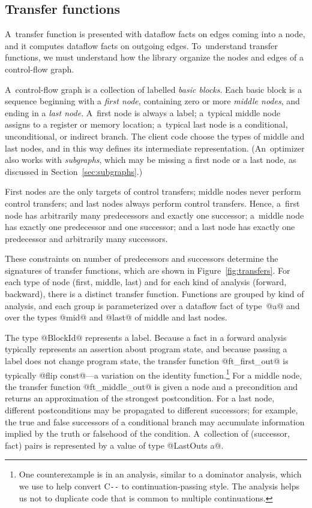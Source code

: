 \documentclass[blockstyle,preprint,natbib,nocopyrightspace]{sigplanconf}
\newcommand\PAL{\mbox{C{\texttt{-{}-}}}}
\newcommand\secref[1]{Section~\ref{sec:#1}}
\newcommand\seclabel[1]{\label{sec:#1}}
\newcommand\figref[1]{Figure~\ref{fig:#1}}
\begin{document}
\subsection{Transfer functions} \seclabel{tffuns}

A~transfer function is presented with dataflow facts on edges coming
into a node, and it computes dataflow facts on outgoing edges.
To~understand transfer functions, we must 
understand how the library organize the nodes and edges of a control-flow graph.

\seclabel{graph.intro}

A~control-flow graph is a collection of labelled \emph{basic blocks}.
Each basic block is a sequence beginning with a \emph{first node},
containing zero or more \emph{middle nodes},
and ending in a \emph{last node}.
A~first node is always a label;
a~typical middle node assigns to a register or memory
location;
a~typical last node is a conditional, unconditional, or indirect branch.
The client code choose the types of middle and last nodes, and in this
way defines its intermediate
representation.
(An~optimizer also works with \emph{subgraphs}, which may be missing a
first node or a last node, as discussed in \secref{subgraphs}.)




First nodes are the only targets of control transfers;
middle nodes never perform control transfers;
and
last nodes always perform control transfers.
Hence, a~first node has arbitrarily many predecessors and exactly one
successor;
a~middle node has exactly one predecessor and one successor;
and a last node has exactly one predecessor and arbitrarily many
successors. 

These constraints on number of predecessors and successors determine
the signatures of 
transfer functions, 
which are shown in \figref{transfers}.
For each type of node (first, middle, last) and for each kind of
analysis (forward, backward), there is a distinct transfer function.
Functions are grouped by kind of analysis, and each group is
parameterized over a dataflow fact of type~@a@ and over the types
@mid@ and @last@ of middle and last nodes.  


The type @BlockId@ represents a label.
Because a fact in a forward analysis typically represents an assertion
about program state,
 and because passing a label does not change
program state, the transfer function @ft_first_out@ is typically 
@flip const@---a variation on
the
identity function.\footnote
{One counterexample is in an
analysis, similar to a dominator analysis,
which we use to help convert {\PAL} to continuation-passing style.
The  analysis
helps us not to duplicate code that is common to multiple continuations.
}
For a middle node, the transfer function @ft_middle_out@ is given a
node and a precondition and returns an approximation of the strongest
postcondition. 
For a last node, different postconditions may be propagated to
different successors; for example, the true and false successors of a
conditional branch may accumulate information implied by the truth or
falsehood of the condition.
A~collection of (successor, fact) pairs is represented by a value of
type @LastOuts a@.
\end{document}
